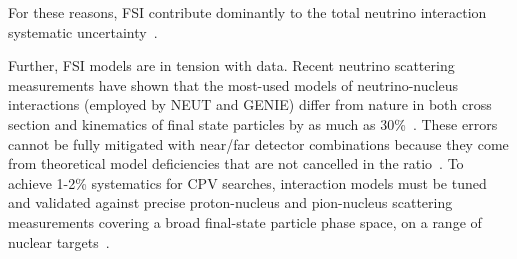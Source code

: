 For these reasons, FSI contribute dominantly to the total neutrino interaction systematic uncertainty~\cite{Abe:2018wpn}.

Further, FSI models are in tension with data.  
Recent neutrino scattering measurements have shown that the most-used models of neutrino-nucleus interactions (employed by NEUT and GENIE) differ from nature in both cross section and kinematics of final state particles by as much as 30\%~\cite{Wascko:2009cn,Wascko:2011hy}. 
These errors cannot be fully mitigated with near/far detector combinations because they come from theoretical model deficiencies that are not cancelled in the ratio~\cite{Coloma:2013rqa}. 
To achieve 1-2\% systematics for CPV searches, interaction models must be tuned and validated against precise proton-nucleus and pion-nucleus scattering measurements covering a broad final-state particle phase space, on a range of nuclear targets~\cite{Cao:2014zra}.

